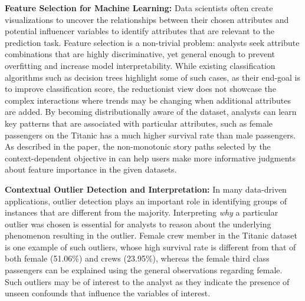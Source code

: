 \npar \textbf{Feature Selection for Machine Learning:} Data scientists often create visualizations to uncover the relationships between their chosen attributes and potential influencer variables to identify attributes that are relevant to the prediction task. Feature selection is a non-trivial problem: analysts seek attribute combinations that are highly discriminative, yet general enough to prevent overfitting and increase model interpretability. While existing classification algorithms such as decision trees highlight some of such cases, as their end-goal is to improve classification score, the reductionist view does not showcase the complex interactions where trends may be changing when additional attributes are added. By becoming distributionally aware of the dataset, analysts can learn key patterns that are associated with particular attributes, such as female passengers on the Titanic has a much higher survival rate than male passengers. As described in the paper, the non-monotonic story paths selected by the context-dependent objective in \system {} can help users make more informative judgments about feature importance in the given datasets.

\npar \textbf{Contextual Outlier Detection and Interpretation:} In many data-driven applications, outlier detection plays an important role in identifying groups of instances that are different from the majority. Interpreting \textit{why} a particular outlier was chosen is essential for analysts to reason about the underlying phenomenon resulting in the outlier. Female crew member in the Titanic dataset is one example of such outliers, whose high survival rate is different from that of both female (51.06\%) and crews (23.95\%), whereas the female third class passengers can be explained using the general observations regarding female. Such outliers may be of interest to the analyst as they indicate the presence of unseen confounds that influence the variables of interest.


